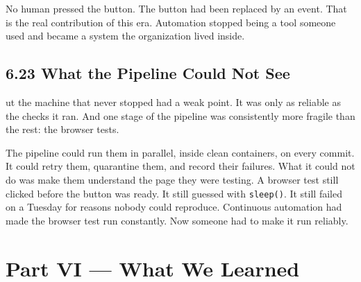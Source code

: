 \documentclass[11pt, a4paper, openany]{book}
\newcommand{\initialcap}[1]{{\fontfamily{lmss}\selectfont\huge\textbf{#1}}}
\begin{document}
\noindent No human pressed the button. The button had been replaced by an event. That is the real contribution of this era. Automation stopped being a tool someone used and became a system the organization lived inside.

\section{6.23 What the Pipeline Could Not See}
\noindent \initialcap{B}ut the machine that never stopped had a weak point. It was only as reliable as the checks it ran. And one stage of the pipeline was consistently more fragile than the rest: the browser tests.

\noindent The pipeline could run them in parallel, inside clean containers, on every commit. It could retry them, quarantine them, and record their failures. What it could not do was make them understand the page they were testing. A browser test still clicked before the button was ready. It still guessed with \texttt{sleep()}. It still failed on a Tuesday for reasons nobody could reproduce. Continuous automation had made the browser test run constantly. Now someone had to make it run reliably.

\chapter*{Part VI --- What We Learned}
\end{document}
